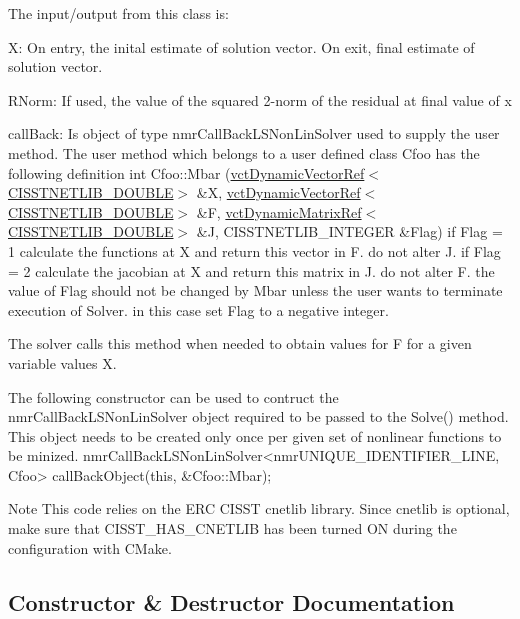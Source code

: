 The input/output from this class is\+:
\begin{DoxyItemize}
\item X\+: On entry, the inital estimate of solution vector. On exit, final estimate of solution vector.
\item R\+Norm\+: If used, the value of the squared 2-\/norm of the residual at final value of x
\item call\+Back\+: Is object of type nmr\+Call\+Back\+L\+S\+Non\+Lin\+Solver used to supply the user method. The user method which belongs to a user defined class \textquotesingle{}Cfoo\textquotesingle{} has the following definition int Cfoo\+::\+Mbar (\hyperlink{classvct_dynamic_vector_ref}{vct\+Dynamic\+Vector\+Ref$<$\+C\+I\+S\+S\+T\+N\+E\+T\+L\+I\+B\+\_\+\+D\+O\+U\+B\+L\+E$>$} \&X, \hyperlink{classvct_dynamic_vector_ref}{vct\+Dynamic\+Vector\+Ref$<$\+C\+I\+S\+S\+T\+N\+E\+T\+L\+I\+B\+\_\+\+D\+O\+U\+B\+L\+E$>$} \&F, \hyperlink{classvct_dynamic_matrix_ref}{vct\+Dynamic\+Matrix\+Ref$<$\+C\+I\+S\+S\+T\+N\+E\+T\+L\+I\+B\+\_\+\+D\+O\+U\+B\+L\+E$>$} \&J, C\+I\+S\+S\+T\+N\+E\+T\+L\+I\+B\+\_\+\+I\+N\+T\+E\+G\+E\+R \&Flag) if Flag = 1 calculate the functions at X and return this vector in F. do not alter J. if Flag = 2 calculate the jacobian at X and return this matrix in J. do not alter F. the value of Flag should not be changed by Mbar unless the user wants to terminate execution of Solver. in this case set Flag to a negative integer.
\end{DoxyItemize}

\begin{DoxyVerb}  The solver calls this method when needed to obtain values for F for
  a given variable values X.

  The following constructor can be used to contruct the nmrCallBackLSNonLinSolver object
  required to be passed to the Solve() method. This object needs to be created
  only once per given set of nonlinear functions to be minized.
      nmrCallBackLSNonLinSolver<nmrUNIQUE_IDENTIFIER_LINE, Cfoo> callBackObject(this, &Cfoo::Mbar);
\end{DoxyVerb}


\begin{DoxyNote}{Note}
This code relies on the E\+R\+C C\+I\+S\+S\+T cnetlib library. Since cnetlib is optional, make sure that C\+I\+S\+S\+T\+\_\+\+H\+A\+S\+\_\+\+C\+N\+E\+T\+L\+I\+B has been turned O\+N during the configuration with C\+Make. 
\end{DoxyNote}


\subsection{Constructor \& Destructor Documentation}
\hypertarget{classnmr_l_s_non_lin_jacobian_solver_a82d63a80d629c6aa4f047dac4724b84a}{}
